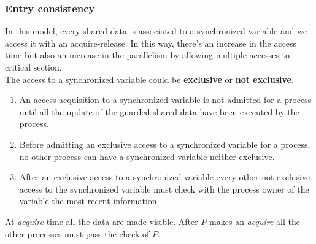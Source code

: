 \subsubsection{Entry consistency}
In this model, every shared data is associated to a synchronized variable and we access it with an acquire-release. In this way, there's an increase in the access time but also an increase in the parallelism by allowing multiple accesses to critical section.\\
The access to a synchronized variable could be \textbf{exclusive} or \textbf{not exclusive}.
\begin{enumerate}
	\item An access acquisition to a synchronized variable is not admitted for a process until all the update of the guarded shared data have been executed by the process.
	\item Before admitting an exclusive access to a synchronized variable for a process, no other process can have a synchronized variable neither exclusive.
	\item After an exclusive access to a synchronized variable every other not exclusive access to the synchronized variable must check with the process owner of the variable the most recent information.
\end{enumerate}
At \textit{acquire} time all the data are made visible. After $P$ makes an \textit{acquire} all the other processes must pass the check of $P$.

